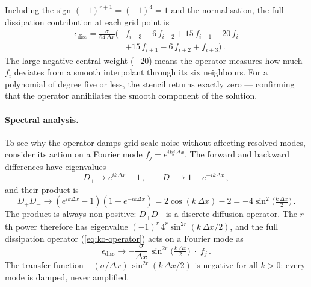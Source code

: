 Including the sign $(-1)^{r+1} = (-1)^4 = 1$ and the normalisation, the
full dissipation contribution at each grid point is
%
\begin{equation}
\begin{split}
  \epsilon_{\text{diss}}
  = \frac{\sigma}{64\,\Delta x}
    \bigl(&f_{i-3} - 6\,f_{i-2} + 15\,f_{i-1} - 20\,f_i \\
    &+ 15\,f_{i+1} - 6\,f_{i+2} + f_{i+3}\bigr) \,.
\end{split}
  \label{eq:ko-explicit}
\end{equation}
%
The large negative central weight ($-20$) means the operator measures
how much $f_i$ deviates from a smooth interpolant through its six
neighbours.  For a polynomial of degree five or less, the stencil
returns exactly zero --- confirming that the operator annihilates the
smooth component of the solution.

\paragraph{Spectral analysis.}

To see why the operator damps grid-scale noise without affecting
resolved modes, consider its action on a Fourier mode
$f_j = e^{i k j \,\Delta x}$.  The forward and backward differences have
eigenvalues
%
\begin{equation}
  D_+ \to e^{ik\Delta x} - 1 \,, \qquad
  D_- \to 1 - e^{-ik\Delta x} \,,
  \label{eq:forward-backward-eigenvalues}
\end{equation}
%
and their product is
%
\begin{equation}
  D_+ D_- \to (e^{ik\Delta x} - 1)(1 - e^{-ik\Delta x})
  = 2\cos(k\,\Delta x) - 2 = -4\sin^2\!\bigl(\tfrac{k\,\Delta x}{2}\bigr) \,.
  \label{eq:dpdm-eigenvalue}
\end{equation}
%
The product is always non-positive: $D_+ D_-$ is a discrete diffusion
operator.  The $r$-th power therefore has eigenvalue
$(-1)^r\,4^r \sin^{2r}(k\,\Delta x/2)$, and the full dissipation
operator (\cref{eq:ko-operator}) acts on a Fourier mode as
%
\begin{equation}
  \epsilon_{\text{diss}} \to
  -\frac{\sigma}{\Delta x}\,\sin^{2r}\!\bigl(\tfrac{k\,\Delta x}{2}\bigr)
  \;\cdot\; f_j \,.
  \label{eq:ko-transfer}
\end{equation}
%
The transfer function $-(\sigma/\Delta x)\,\sin^{2r}(k\,\Delta x/2)$
is negative for all $k > 0$: every mode is damped, never amplified.

